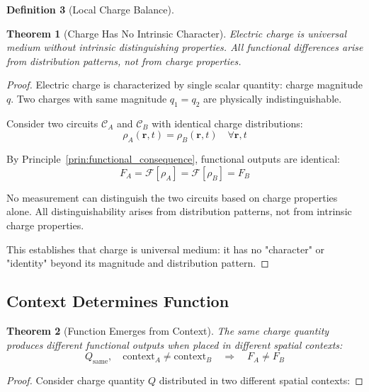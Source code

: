 \documentclass[12pt,a4paper]{article}
\theoremstyle{plain}
\newtheorem{theorem}{Theorem}[section]
\theoremstyle{definition}
\newtheorem{definition}[theorem]{Definition}
\theoremstyle{remark}
\begin{document}
\begin{definition}[Local Charge Balance]
\begin{theorem}[Charge Has No Intrinsic Character]
\label{thm:charge_no_character}
Electric charge is universal medium without intrinsic distinguishing properties. All functional differences arise from distribution patterns, not from charge properties.
\end{theorem}

\begin{proof}
Electric charge is characterized by single scalar quantity: charge magnitude $q$. Two charges with same magnitude $q_1 = q_2$ are physically indistinguishable.

Consider two circuits $\mathcal{C}_A$ and $\mathcal{C}_B$ with identical charge distributions:
\begin{equation}
\rho_A(\mathbf{r},t) = \rho_B(\mathbf{r},t) \quad \forall \mathbf{r}, t
\end{equation}

By Principle~\ref{prin:functional_consequence}, functional outputs are identical:
\begin{equation}
F_A = \mathcal{F}[\rho_A] = \mathcal{F}[\rho_B] = F_B
\end{equation}

No measurement can distinguish the two circuits based on charge properties alone. All distinguishability arises from distribution patterns, not from intrinsic charge properties.

This establishes that charge is universal medium: it has no "character" or "identity" beyond its magnitude and distribution pattern.
\end{proof}

\subsection{Context Determines Function}

\begin{theorem}[Function Emerges from Context]
\label{thm:function_from_context}
The same charge quantity produces different functional outputs when placed in different spatial contexts:
\begin{equation}
Q_{\text{same}}, \quad \text{context}_A \neq \text{context}_B \quad \Rightarrow \quad F_A \neq F_B
\end{equation}
\end{theorem}

\begin{proof}
Consider charge quantity $Q$ distributed in two different spatial contexts:


\end{proof}
\end{definition}
\end{document}
